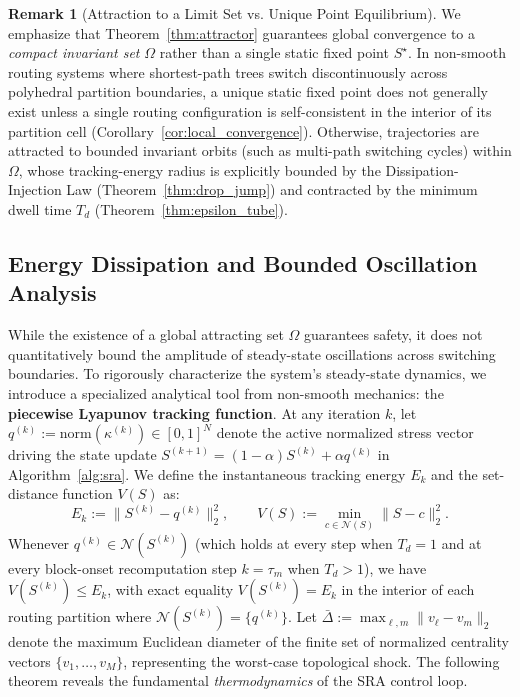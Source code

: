 \documentclass[journal]{IEEEtran}
\theoremstyle{plain}
\theoremstyle{definition}
\newtheorem{remark}{Remark}
\newcommand{\rev}[1]{{\color{blue}#1}}
\begin{document}
\rev{\begin{remark}[Attraction to a Limit Set vs. Unique Point Equilibrium]
\label{rem:attractor_vs_unique}
We emphasize that Theorem~\ref{thm:attractor} guarantees global convergence to a \textit{compact invariant set} $\Omega$ rather than a single static fixed point $S^\star$. In non-smooth routing systems where shortest-path trees switch discontinuously across polyhedral partition boundaries, a unique static fixed point does not generally exist unless a single routing configuration is self-consistent in the interior of its partition cell (Corollary~\ref{cor:local_convergence}). Otherwise, trajectories are attracted to bounded invariant orbits (such as multi-path switching cycles) within $\Omega$, whose tracking-energy radius is explicitly bounded by the Dissipation-Injection Law (Theorem~\ref{thm:drop_jump}) and contracted by the minimum dwell time $T_d$ (Theorem~\ref{thm:epsilon_tube}).
\end{remark}}

\subsection{Energy Dissipation and Bounded Oscillation Analysis}
\label{subsec:lyapunov}

While the existence of a global attracting set $\Omega$ guarantees safety, it does not quantitatively bound the amplitude of steady-state oscillations across switching boundaries. 
To rigorously characterize the system's steady-state dynamics, we introduce a specialized analytical tool from non-smooth mechanics: the \textbf{piecewise Lyapunov tracking function}.
\rev{At any iteration $k$, let $q^{(k)} := \mathrm{norm}(\kappa^{(k)}) \in [0,1]^N$ denote the active normalized stress vector driving the state update $S^{(k+1)} = (1-\alpha)S^{(k)} + \alpha q^{(k)}$ in Algorithm~\ref{alg:sra}. We define the instantaneous tracking energy $E_k$ and the set-distance function $V(S)$ as:
\begin{equation}\label{eq:lyapunov_def}
E_k := \|S^{(k)} - q^{(k)}\|_2^2, \qquad V(S) := \min_{c\in\mathcal N(S)}\|S-c\|_2^2.
\end{equation}
Whenever $q^{(k)} \in \mathcal{N}(S^{(k)})$ (which holds at every step when $T_d=1$ and at every block-onset recomputation step $k=\tau_m$ when $T_d > 1$), we have $V(S^{(k)}) \le E_k$, with exact equality $V(S^{(k)}) = E_k$ in the interior of each routing partition where $\mathcal{N}(S^{(k)}) = \{q^{(k)}\}$.}
Let $\bar{\Delta} := \max_{\ell, m} \|v_\ell - v_m\|_2$ denote the maximum Euclidean diameter of the finite set of normalized centrality vectors $\{v_1, \dots, v_M\}$, representing the worst-case topological shock. 
The following theorem reveals the fundamental \textit{thermodynamics} of the SRA control loop.
\end{document}
